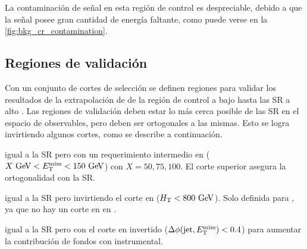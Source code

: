 

La contaminación de señal en esta región de control es despreciable, debido a
que la señal posee gran cantidad de energía faltante, como puede verse en la
\cref{fig:bkg_cr_contamination}.







\subsection{Regiones de validación}\label{sec:bkg_vrs2}

Con un conjunto de cortes de selección se definen regiones para validar los resultados de la
extrapolación de {\gjet} de la región de control a bajo {\met} hasta
las SR a alto {\met}. Las regiones de validación deben estar lo más cerca posible
de las SR en el espacio de observables, pero deben ser ortogonales a las mismas.
Esto se logra invirtiendo algunos cortes, como se describe a continuación.

\begin{description}\itemsep0.1cm
\item[{\bf VRMX}] igual a la SR pero con un requerimiento intermedio en {\met}
  ($X\gev < \met < 150\gev$) con $X = 50,75,100$. El corte superior asegura la
  ortogonalidad con la SR.
\item[{\bf VRH}] igual a la SR pero invirtiendo el corte en {\HT} ($\HT<
  800\gev$). Solo definida para {\SRH}, ya que no hay un corte en {\HT} en
  {\SRL}.
\item[{\bf VRQ}] igual a la SR pero con el corte en {\dphijm} invertido ($
  \Delta \phi (\mathrm{jet},E_{\mathrm{T}}^{\mathrm{miss}}) < 0.4$) para aumentar la contribución de fondos con {\met}
  instrumental.
\end{description}

